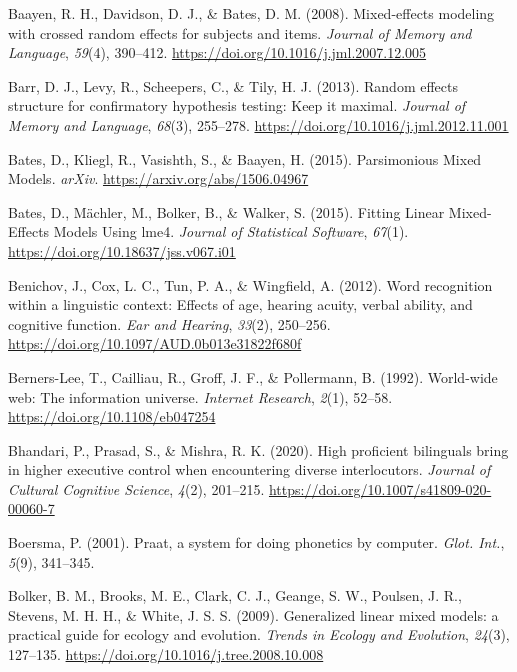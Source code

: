 \documentclass[a4paper, nobind]{templates/ociamthesis}
\newlength{\cslhangindent}
\newenvironment{CSLReferences}[2] %
 {%
  \setlength{\parindent}{0pt}
  \ifodd #1
  \let\oldpar\par
  \def\par{\hangindent=\cslhangindent\oldpar}
  \fi
  \setlength{\parskip}{1mm}
  \setlength{\baselineskip}{6mm}
 }%
 {}
\begin{document}
\begin{CSLReferences}{1}{0}
\leavevmode{}%
Baayen, R. H., Davidson, D. J., \& Bates, D. M. (2008). {Mixed-effects modeling with crossed random effects for subjects and items}. \emph{Journal of Memory and Language}, \emph{59}(4), 390--412. \url{https://doi.org/10.1016/j.jml.2007.12.005}

\leavevmode{}%
Barr, D. J., Levy, R., Scheepers, C., \& Tily, H. J. (2013). Random effects structure for confirmatory hypothesis testing: Keep it maximal. \emph{Journal of Memory and Language}, \emph{68}(3), 255--278. \url{https://doi.org/10.1016/j.jml.2012.11.001}

\leavevmode{}%
Bates, D., Kliegl, R., Vasishth, S., \& Baayen, H. (2015). {Parsimonious Mixed Models}. \emph{arXiv}. \url{https://arxiv.org/abs/1506.04967}

\leavevmode{}%
Bates, D., Mächler, M., Bolker, B., \& Walker, S. (2015). Fitting Linear Mixed-Effects Models Using lme4. \emph{Journal of Statistical Software}, \emph{67}(1). \url{https://doi.org/10.18637/jss.v067.i01}

\leavevmode{}%
Benichov, J., Cox, L. C., Tun, P. A., \& Wingfield, A. (2012). {Word recognition within a linguistic context: Effects of age, hearing acuity, verbal ability, and cognitive function}. \emph{Ear and Hearing}, \emph{33}(2), 250--256. \url{https://doi.org/10.1097/AUD.0b013e31822f680f}

\leavevmode{}%
Berners-Lee, T., Cailliau, R., Groff, J. F., \& Pollermann, B. (1992). {World-wide web: The information universe}. \emph{Internet Research}, \emph{2}(1), 52--58. \url{https://doi.org/10.1108/eb047254}

\leavevmode{}%
Bhandari, P., Prasad, S., \& Mishra, R. K. (2020). High proficient bilinguals bring in higher executive control when encountering diverse interlocutors. \emph{Journal of Cultural Cognitive Science}, \emph{4}(2), 201--215. \url{https://doi.org/10.1007/s41809-020-00060-7}

\leavevmode{}%
Boersma, P. (2001). Praat, a system for doing phonetics by computer. \emph{Glot. Int.}, \emph{5}(9), 341--345.

\leavevmode{}%
Bolker, B. M., Brooks, M. E., Clark, C. J., Geange, S. W., Poulsen, J. R., Stevens, M. H. H., \& White, J. S. S. (2009). {Generalized linear mixed models: a practical guide for ecology and evolution}. \emph{Trends in Ecology and Evolution}, \emph{24}(3), 127--135. \url{https://doi.org/10.1016/j.tree.2008.10.008}


\end{CSLReferences}
\end{document}
